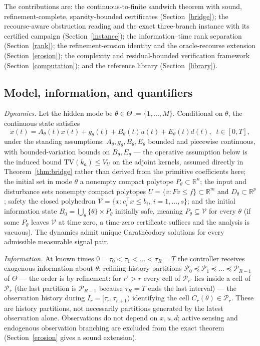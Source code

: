 \documentclass[10pt,twocolumn]{article}
\theoremstyle{plain}
\theoremstyle{definition}
\theoremstyle{remark}
\begin{document}
The contributions are: the continuous-to-finite sandwich theorem with sound,
refinement-complete, sparsity-bounded certificates (Section~\ref{bridge});
the recourse-aware obstruction reading and the exact three-branch instance
with its certified campaign (Section~\ref{instance}); the
information--time rank separation (Section~\ref{rank}); the refinement-erosion
identity and the oracle-recourse extension (Section~\ref{erosion}); the
complexity and residual-bounded verification framework
(Section~\ref{computation}); and the reference library
(Section~\ref{library}).

\subsection{Model, information, and quantifiers}\label{model}

\emph{Dynamics.} Let the hidden mode be
\(\theta \in \Theta := \{1,\dots,M\}\). Conditional on \(\theta\), the
continuous state satisfies
\[
\dot x(t) = A_\theta(t)x(t) + g_\theta(t) + B_\theta(t)u(t) + E_\theta(t)d(t),
\;\; t \in [0,T],
\]
under the standing assumptions: \(A_\theta, g_\theta, B_\theta, E_\theta\)
bounded and piecewise continuous, with bounded-variation bounds on
\(B_\theta, E_\theta\) --- the operative assumption below is the induced
bound \(\mathrm{TV}(k_a) \le V_U\) on the adjoint kernels, assumed
directly in Theorem~\ref{thm:bridge} rather than derived from the
primitive coefficients here; the initial set in mode \(\theta\) a nonempty compact
polytope \(P_\theta \subset \mathbb{R}^n\); the input and disturbance sets
nonempty compact polytopes \(U = \{v : Fv \le f\} \subset \mathbb{R}^m\) and
\(D_\theta \subset \mathbb{R}^p\); safety the closed polyhedron
\(\mathcal{V} = \{x : c_i^\top x \le b_i,\ i = 1,\dots,s\}\); and the initial
information state
\(B_0 = \bigcup_{\theta} \{\theta\} \times P_\theta\) initially safe,
meaning \(P_\theta \subseteq \mathcal{V}\) for every \(\theta\) (if some
\(P_\theta\) leaves \(\mathcal{V}\) at time zero, a time-zero certificate
suffices and the analysis is vacuous). The dynamics admit unique
Carath\'eodory solutions for every admissible measurable signal pair.

\emph{Information.} At known times
\(0 = \tau_0 < \tau_1 < \dots < \tau_R = T\) the controller receives
exogenous information about \(\theta\): refining history partitions
\(\mathcal{P}_0 \preceq \mathcal{P}_1 \preceq \dots \preceq \mathcal{P}_{R-1}\)
of \(\Theta\) --- the order is by refinement: for \(r' > r\) every cell of
\(\mathcal{P}_{r'}\) lies inside a cell of \(\mathcal{P}_r\) (the last
partition is \(\mathcal{P}_{R-1}\) because \(\tau_R = T\) ends the last
interval) --- the observation history during
\(I_r = [\tau_r, \tau_{r+1})\) identifying the cell \(C_r(\theta) \in
\mathcal{P}_r\). These are history partitions, not necessarily partitions
generated by the latest observation alone. Observations do not depend on
\(x, u, d\); active sensing and endogenous observation branching are excluded
from the exact theorem (Section~\ref{erosion} gives a sound extension).
\end{document}
